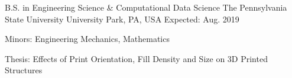 
\begin{cventries}
	\cventry
	{B.S. in Engineering Science \& Computational Data Science} %
	{The Pennsylvania State University} %
	{University Park, PA, USA} %
	{Expected: Aug. 2019} %
	{
		\begin{cvitems} %
			\item {Minors: Engineering Mechanics, Mathematics}
			\item {Thesis: Effects of Print Orientation, Fill Density and Size on 3D Printed Structures}
		\end{cvitems}
	}
\end{cventries}